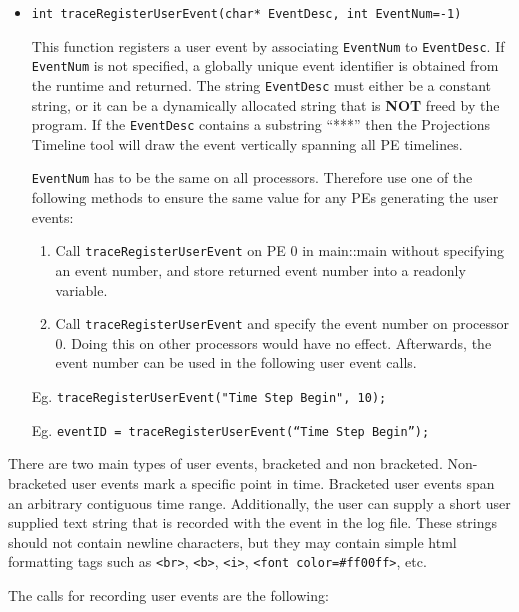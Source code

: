 \begin{itemize}
\item
{\tt int traceRegisterUserEvent(char* EventDesc, int EventNum=-1) }

This function registers a user event by associating {\tt EventNum} to
{\tt EventDesc}. If {\tt EventNum} is not specified, a globally unique
event identifier is obtained from the runtime and returned. The string {\tt EventDesc} must either be a constant string, or it can be a dynamically allocated string that is {\bf NOT} freed by the program. If the {\tt EventDesc} contains a substring ``***'' then the Projections Timeline tool will draw the event vertically spanning all PE timelines.

{\tt EventNum} has to be the same on all processors. Therefore use one of the following methods to ensure the same value for any PEs generating the user events:

\begin{enumerate}
\item
Call {\tt traceRegisterUserEvent} on PE 0 in main::main without specifying
an event number, and store returned event number into a readonly variable.
\item
Call {\tt traceRegisterUserEvent} and specify the event number on
processor 0. Doing this on other processors would have no
effect. Afterwards, the event number can be used in the following user
event calls.
\end{enumerate}

Eg. {\tt traceRegisterUserEvent("Time Step Begin", 10);}

Eg. {\tt eventID = traceRegisterUserEvent(``Time Step Begin'');}

\end{itemize}



There are two main types of user events, bracketed and non bracketed. Non-bracketed user events mark a specific point in time. Bracketed user events span an arbitrary contiguous time range. Additionally, the user can supply a short user supplied text string that is recorded with the event in the log file. These strings should not contain newline characters, but they may contain simple html formatting tags such as \texttt{<br>}, \texttt{<b>}, \texttt{<i>}, \texttt{<font color=\#ff00ff>}, etc.

The calls for recording user events are the following:

